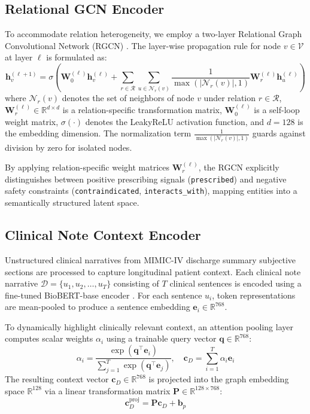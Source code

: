 \documentclass[11pt,a4paper]{article}
\begin{document}
\subsection{Relational GCN Encoder}

To accommodate relation heterogeneity, we employ a two-layer Relational Graph Convolutional Network (RGCN) \cite{schlichtkrull2018modeling}. The layer-wise propagation rule for node $v \in \mathcal{V}$ at layer $\ell$ is formulated as:
\begin{equation}
\mathbf{h}_v^{(\ell+1)} = \sigma \left( \mathbf{W}_0^{(\ell)} \mathbf{h}_v^{(\ell)} + \sum_{r \in \mathcal{R}} \sum_{u \in \mathcal{N}_r(v)} \frac{1}{\max(|\mathcal{N}_r(v)|, 1)} \mathbf{W}_r^{(\ell)} \mathbf{h}_u^{(\ell)} \right)
\label{eq:rgcn}
\end{equation}
where $\mathcal{N}_r(v)$ denotes the set of neighbors of node $v$ under relation $r \in \mathcal{R}$, $\mathbf{W}_r^{(\ell)} \in \mathbb{R}^{d \times d}$ is a relation-specific transformation matrix, $\mathbf{W}_0^{(\ell)}$ is a self-loop weight matrix, $\sigma(\cdot)$ denotes the LeakyReLU activation function, and $d=128$ is the embedding dimension. The normalization term $\frac{1}{\max(|\mathcal{N}_r(v)|, 1)}$ guards against division by zero for isolated nodes. 

By applying relation-specific weight matrices $\mathbf{W}_r^{(\ell)}$, the RGCN explicitly distinguishes between positive prescribing signals (\texttt{prescribed}) and negative safety constraints (\texttt{contraindicated}, \texttt{interacts\_with}), mapping entities into a semantically structured latent space.

\subsection{Clinical Note Context Encoder}

Unstructured clinical narratives from MIMIC-IV discharge summary subjective sections are processed to capture longitudinal patient context. Each clinical note narrative $\mathcal{D} = \{u_1, u_2, \dots, u_T\}$ consisting of $T$ clinical sentences is encoded using a fine-tuned BioBERT-base encoder \cite{lee2020biobert}. For each sentence $u_i$, token representations are mean-pooled to produce a sentence embedding $\mathbf{e}_i \in \mathbb{R}^{768}$.

To dynamically highlight clinically relevant context, an attention pooling layer computes scalar weights $\alpha_i$ using a trainable query vector $\mathbf{q} \in \mathbb{R}^{768}$:
\begin{equation}
\alpha_i = \frac{\exp(\mathbf{q}^\top \mathbf{e}_i)}{\sum_{j=1}^T \exp(\mathbf{q}^\top \mathbf{e}_j)}, \quad \mathbf{c}_D = \sum_{i=1}^T \alpha_i \mathbf{e}_i
\label{eq:attention}
\end{equation}
The resulting context vector $\mathbf{c}_D \in \mathbb{R}^{768}$ is projected into the graph embedding space $\mathbb{R}^{128}$ via a linear transformation matrix $\mathbf{P} \in \mathbb{R}^{128 \times 768}$:
\begin{equation}
\mathbf{c}_D^{\text{proj}} = \mathbf{P} \mathbf{c}_D + \mathbf{b}_p
\end{equation}
\end{document}
